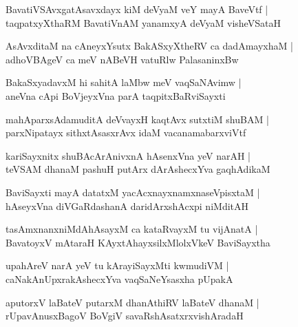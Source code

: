 \begin{shloka}
BavatiVSAvxgatAsavxdayx kiM deVyaM veY mayA BaveVtf |\\
taqpatxyXthaRM BavatiVnAM yanamxyA deVyaM visheVSataH 
\end{shloka}

\begin{shloka}
AsAvxditaM na cAneyxYsutx BakASxyXtheRV ca dadAmayxhaM |\\
adhoVBAgeV ca meV nABeVH vatuRlw PalasaninxBw
\end{shloka}

\begin{shloka}
BakaSxyadavxM hi sahitA laMbw meV vaqSaNAvimw |\\
aneVna cApi BoVjeyxVna parA taqpitxBaRviSayxti
\end{shloka}

\begin{shloka}
mahAparxsAdamuditA deVvayxH kaqtAvx sutxtiM shuBAM |\\
parxNipatayx sithxtAsasxrAvx idaM vacanamabarxviVtf 
\end{shloka}

\begin{shloka}
kariSayxnitx shuBAcArAnivxnA hAsenxVna yeV narAH |\\
teVSAM dhanaM pashuH putArx dArAshecxYva gaqhAdikaM
\end{shloka}

\begin{shloka}
BaviSayxti mayA datatxM yacAcxnayxnamxnaseVpisxtaM |\\
hAseyxVna diVGaRdashanA daridArxshAcxpi niMditAH 
\end{shloka}

\begin{shloka}
tasAmxnanxniMdAhAsayxM ca kataRvayxM tu vijAnatA |\\
BavatoyxV mAtaraH KAyxtAhayxsilxMlolxVkeV BaviSayxtha
\end{shloka}

\begin{shloka}
upahAreV narA yeV tu kArayiSayxMti kwmudiVM |\\
caNakAnUpxrakAshecxYva vaqSaNeYsasxha pUpakA\R
\end{shloka}

\begin{shloka}
aputorxV laBateV putarxM dhanAthiRV laBateV dhanaM |\\
rUpavAnusxBagoV BoVgiV savaRshAsatxrxvishAradaH
\end{shloka}

